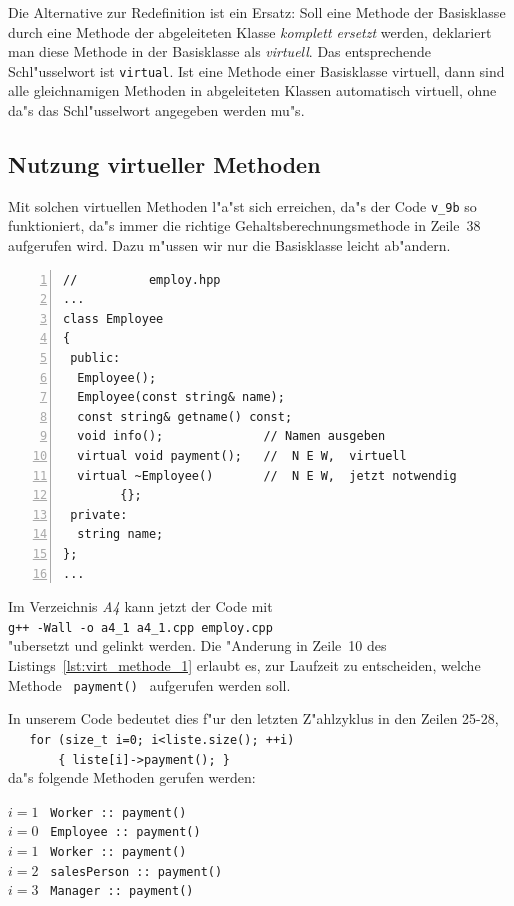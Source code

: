 Die Alternative zur Redefinition ist ein Ersatz: Soll eine
Methode der Basisklasse durch eine Methode der abgeleiteten Klasse
\emph{komplett ersetzt} werden, deklariert man diese Methode in der Basisklasse
als \emph{virtuell}. Das entsprechende Schl"usselwort ist
\verb|virtual|. Ist eine Methode einer Basisklasse virtuell, dann sind
alle gleichnamigen Methoden in abgeleiteten Klassen automatisch virtuell, ohne
da"s das Schl"usselwort angegeben werden mu"s.
%
%
\subsection{Nutzung virtueller Methoden}
\label{sec:A2.1}
%
Mit solchen virtuellen Methoden l"a"st sich erreichen, 
da"s der Code \texttt{v\_9b} so funktioniert, 
da"s immer die richtige
Gehaltsberechnungsmethode in Zeile~38 aufgerufen wird. Dazu m"ussen wir nur
die Basisklasse leicht ab"andern.
\begin{lstlisting}[caption={Virtuelle Methoden},label=lst:virt_methode_1,
basicstyle=\scriptsize,numbers=left, numberstyle=\tiny, stepnumber=2, numbersep=5pt]
//			employ.hpp
...
class Employee
{
 public:
  Employee();
  Employee(const string& name);
  const string& getname() const;
  void info();				// Namen ausgeben
  virtual void payment();	//  N E W,  virtuell
  virtual ~Employee()		//  N E W,  jetzt notwendig
  		{};
 private:
  string name;
};
...
\end{lstlisting}

Im Verzeichnis \textit{A4} kann jetzt der Code mit
\\
\verb|g++ -Wall -o a4_1 a4_1.cpp employ.cpp|
\\
"ubersetzt und gelinkt werden.
%
\pagebreak[2]
%
Die "Anderung in Zeile~10 des Listings~\ref{lst:virt_methode_1} erlaubt es, zur Laufzeit zu entscheiden,
welche Methode \verb| payment() | aufgerufen werden soll.
\\
\begin{minipage}[t]{0.5\textwidth}
In unserem Code bedeutet dies f"ur den letzten Z"ahlzyklus
in den Zeilen 25-28, \\[1ex]
\verb|   for (size_t i=0; i<liste.size(); ++i)| \\
\verb|       { liste[i]->payment(); }| \\[1ex]
da"s folgende Methoden gerufen werden:
\end{minipage}
\hfill
\begin{minipage}[t]{0.45\textwidth}
\begin{tabbing}
 $i=1$ \= \verb| Worker :: payment() | \kill \\
 $i=0$ \> \verb| Employee :: payment() | \\
 $i=1$ \> \verb| Worker :: payment() | \\
 $i=2$ \> \verb| salesPerson :: payment() | \\
 $i=3$ \> \verb| Manager :: payment() | \\
\end{tabbing}
\end{minipage}

